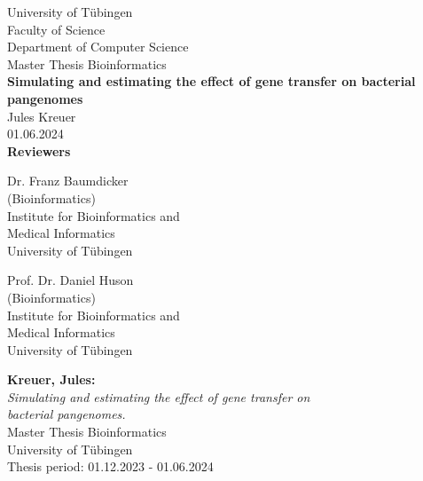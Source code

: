 \documentclass[twoside,12pt,a4paper]{report}
\author{Jules Kreuer}
\begin{document}

\begin{titlepage}
    \begin{center}
        {\LARGE University of T\"ubingen}\\
        {\large Faculty of Science \\
        Department of Computer Science\\[4cm]}
        {\huge Master Thesis Bioinformatics\\[2cm]}
        {\Large\bf Simulating and estimating the effect of gene transfer on bacterial pangenomes\\[1.5cm]}
        {\large Jules Kreuer}\\[0.5cm]
        01.06.2024\\[3cm]
        {\small\bf Reviewers}\\[0.5cm]
        \parbox{7cm}{\begin{center}{\large Dr. Franz Baumdicker}\\
                (Bioinformatics)\\
                {\footnotesize Institute for Bioinformatics and\\ Medical Informatics\\
                University of T\"ubingen}\end{center}}\hfill\parbox{7cm}{\begin{center}
                {\large Prof. Dr. Daniel Huson}\\
                (Bioinformatics)\\
                {\footnotesize Institute for Bioinformatics and\\ Medical Informatics\\
                University of T\"ubingen}\end{center}
        }
    \end{center}
\end{titlepage}



\thispagestyle{empty}
\vspace*{\fill}
\begin{minipage}{11cm}
    \textbf{Kreuer, Jules:}\\
    \emph{Simulating and estimating the effect of gene transfer on
        \\bacterial pangenomes.}\\ Master Thesis Bioinformatics\\
    University of T\"ubingen\\
    Thesis period: 01.12.2023 - 01.06.2024 %
\end{minipage}
\newpage
\end{document}
